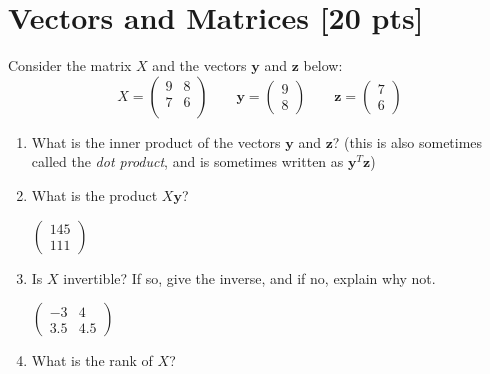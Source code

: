 \documentclass[a4paper]{article}
\theoremstyle{definition}
\newenvironment{soln}{
    \leavevmode\color{blue}\ignorespaces
}{}
\begin{document}
\section{Vectors and Matrices [20 pts]}
Consider the matrix $X$ and the vectors $\mathbf{y}$ and $\textbf{z}$ below:
$$
X = \begin{pmatrix}
9 & 8 \\ 7 & 6 \\
\end{pmatrix}
\qquad \mathbf{y} = \begin{pmatrix}
9 \\ 8
\end{pmatrix} \qquad \mathbf{z} = \begin{pmatrix}
7 \\ 6
\end{pmatrix}
$$
\begin{enumerate}
	\item 	What is the inner product of the vectors $\mathbf{y}$ and $\mathbf{z}$? (this is also sometimes called the \emph{dot product}, and is sometimes written as $\mathbf{y}^T\mathbf{z}$)\\
	    \begin{soln} 111 \end{soln}
	\item 	What is the product $X\mathbf{y}$?\\
		\begin{soln}  
	    		$\begin{pmatrix}
				145 \\ 111
			\end{pmatrix}$
		\end{soln}
	\item 	Is $X$ invertible? If so, give the inverse, and if no, explain why not.\\
	\begin{soln}  
        		$\begin{pmatrix}
			-3 & 4 \\ 3.5 & 4.5
		\end{pmatrix}$ 
	\end{soln}
	\item 	What is the rank of $X$?\\
	    \begin{soln}  2 \end{soln}
\end{enumerate}
\end{document}
